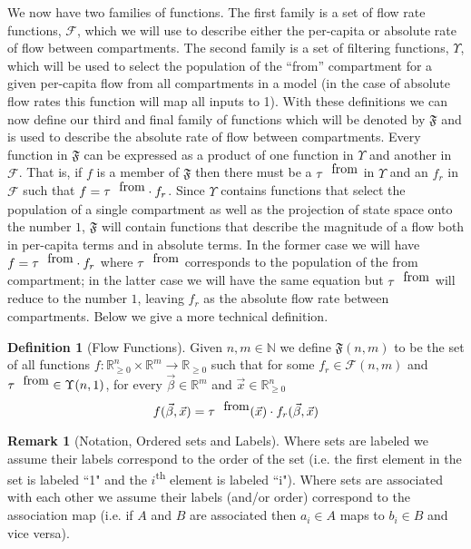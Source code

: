 \documentclass[pdflatex,sn-basic]{sn-jnl}%
\theoremstyle{definition}
\newtheorem{definition}{Definition}
\newtheorem{remark}{Remark}
\newcommand{\N}{\mathbb{N}}%
\newcommand{\R}{\mathbb{R}}%
\newcommand{\Rnn}{\mathbb{R}_{\ge 0}}%
\newcommand{\flowfunc}[1]{\mathfrak{F}(#1)}%
\newcommand{\flowfuncnull}{\mathfrak{F}}
\newcommand{\betavec}{\vec{\beta}}
\newcommand{\xvec}{\vec{x}}
\newcommand{\fr}{\ensuremath{\mathcal F}}
\newcommand{\tauf}{\tau^{\mbox{\tiny from}}}
\begin{document}
We now have two families of functions. The first family is a set of flow rate functions, $\fr$, which we will use to describe either the per-capita or absolute rate of flow between compartments. The second family is a set of filtering functions, $\Upsilon$, which will be used to select the population of the ``from'' compartment for a given per-capita flow from all compartments in a model (in the case of absolute flow rates this function will map all inputs to 1). With these definitions we can now define our third and final family of functions which will be denoted by $\flowfuncnull$ and is used to describe the absolute rate of flow between compartments. Every function in $\flowfuncnull$ can be expressed as a product of one function in $\Upsilon$ and another in $\fr$. That is, if $f$ is a member of $\flowfuncnull$ then there must be a $\tauf$ in $\Upsilon$ and an $f_r$ in $\fr$ such that $f = \tauf \cdot f_r$. Since $\Upsilon$ contains functions that select the population of a single compartment as well as the projection of state space onto the number $1$, $\flowfuncnull$ will contain functions that describe the magnitude of a flow both in per-capita terms and in absolute terms. In the former case we will have $f = \tauf\cdot f_r$ where $\tauf$ corresponds to the population of the from compartment;  in the latter case we will have the same equation but $\tauf$ will reduce to the number $1$, leaving $f_r$ as the absolute flow rate between compartments. Below we give a more technical definition.

\begin{definition}[Flow Functions]\label{flowfunc}
     Given $n,m\in\N$ we define $\flowfunc{n,m}$ to be the set of all functions $f:\Rnn^n\times\R^m\rightarrow\Rnn$ such that for some $f_r\in\fr(n,m)$ and $\tauf\in\Upsilon(n, 1)$, for every $\betavec\in\R^m$ and $\xvec\in\Rnn^n$
     \begin{equation}
        f(\betavec, \xvec) = \tauf(\xvec)\cdot f_r(\betavec, \xvec)
     \end{equation}
\end{definition}

\begin{remark}[Notation, Ordered sets and Labels]
    Where sets are labeled we assume their labels correspond to the order of the set (i.e. the first element in the set is labeled “1" and the $i$\textsuperscript{th} element is labeled ``i"). Where sets are associated with each other we assume their labels (and/or order) correspond to the association map (i.e. if $A$ and $B$ are associated then $a_i\in A$ maps to $b_i\in B$ and vice versa).  
\end{remark}
\end{document}
